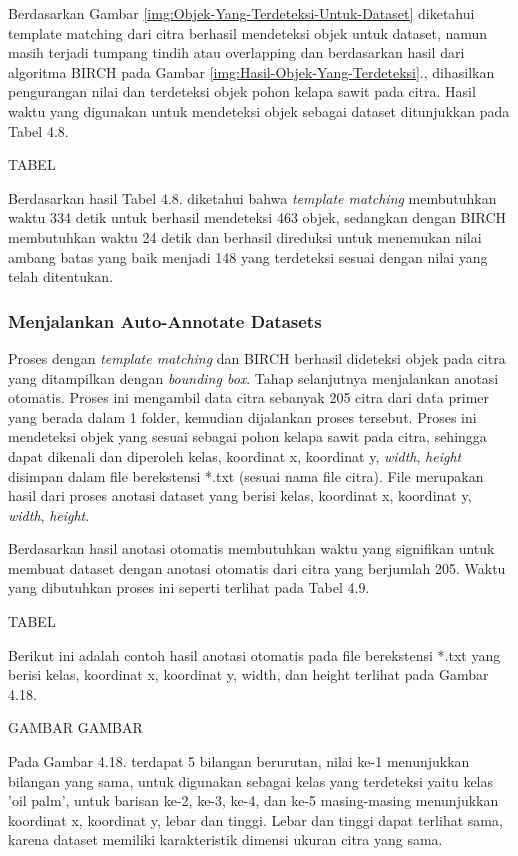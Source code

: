 Berdasarkan Gambar \ref{img:Objek-Yang-Terdeteksi-Untuk-Dataset} diketahui template matching dari citra berhasil mendeteksi objek untuk dataset, namun masih terjadi tumpang tindih atau overlapping dan berdasarkan hasil dari algoritma BIRCH pada Gambar \ref{img:Hasil-Objek-Yang-Terdeteksi}., dihasilkan pengurangan nilai dan terdeteksi objek pohon kelapa sawit pada citra. Hasil waktu yang digunakan untuk mendeteksi objek sebagai dataset ditunjukkan pada Tabel 4.8.

TABEL

Berdasarkan hasil Tabel 4.8. diketahui bahwa \textit{template matching} membutuhkan waktu 334 detik untuk berhasil mendeteksi 463 objek, sedangkan dengan BIRCH membutuhkan waktu 24 detik dan berhasil direduksi untuk menemukan nilai ambang batas yang baik menjadi 148 yang terdeteksi sesuai dengan nilai yang telah ditentukan. 

\subsubsection{Menjalankan Auto-Annotate Datasets}
\hspace{1,2cm}
Proses dengan \textit{template matching} dan BIRCH berhasil dideteksi objek pada citra yang ditampilkan dengan \textit{bounding box}. Tahap selanjutnya menjalankan anotasi otomatis. Proses ini mengambil data citra sebanyak 205 citra dari data primer yang berada dalam 1 folder, kemudian dijalankan proses tersebut. Proses ini mendeteksi objek yang sesuai sebagai pohon kelapa sawit pada citra, sehingga dapat dikenali dan diperoleh kelas, koordinat x, koordinat y, \textit{width}, \textit{height} disimpan dalam file berekstensi *.txt (sesuai nama file citra). File merupakan hasil dari proses anotasi dataset yang berisi kelas, koordinat x, koordinat y, \textit{width}, \textit{height}.

Berdasarkan hasil anotasi otomatis membutuhkan waktu yang signifikan untuk membuat dataset dengan anotasi otomatis dari citra yang berjumlah 205. Waktu yang dibutuhkan proses ini seperti terlihat pada Tabel 4.9.

TABEL

Berikut ini adalah contoh hasil anotasi otomatis pada file berekstensi *.txt yang berisi kelas, koordinat x, koordinat y, width, dan height terlihat pada Gambar 4.18.

GAMBAR
GAMBAR

Pada Gambar 4.18. terdapat 5 bilangan berurutan, nilai ke-1 menunjukkan bilangan yang sama, untuk digunakan sebagai kelas yang terdeteksi yaitu kelas 'oil palm', untuk barisan ke-2, ke-3, ke-4, dan ke-5 masing-masing menunjukkan koordinat x, koordinat y, lebar dan tinggi. Lebar dan tinggi dapat terlihat sama, karena dataset memiliki karakteristik dimensi ukuran citra yang sama.

